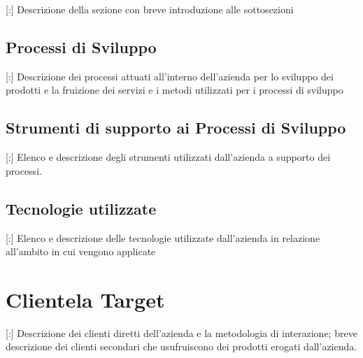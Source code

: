 \documentclass[11pt]{book}              %
\begin{document}
[:] Descrizione della sezione con breve introduzione alle sottosezioni

\subsection{Processi di Sviluppo}

[:] Descrizione dei processi attuati all'interno dell'azienda per lo sviluppo dei prodotti e la fruizione dei servizi e i metodi utilizzati per i processi di sviluppo

\subsection{Strumenti di supporto ai Processi di Sviluppo}

[:] Elenco e descrizione degli strumenti utilizzati dall'azienda a supporto dei processi.

\subsection{Tecnologie utilizzate}

[:] Elenco e descrizione delle tecnologie utilizzate dall'azienda in relazione all'ambito in cui vengono applicate

\section{Clientela Target}

[:] Descrizione dei clienti diretti dell'azienda e la metodologia di interazione; breve descrizione dei clienti secondari che usufruiscono dei prodotti erogati dall'azienda.
\end{document}
